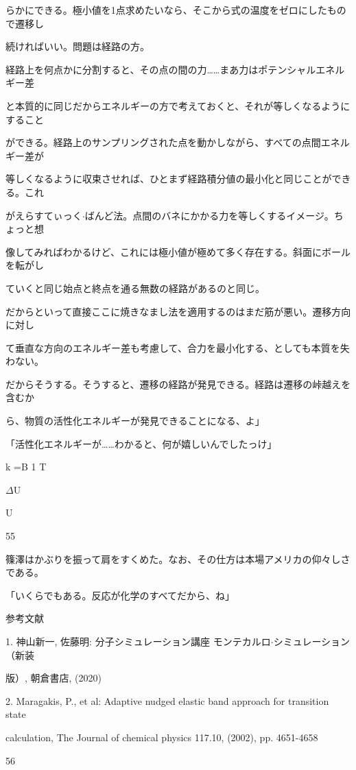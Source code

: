 らかにできる。極⼩値を1点求めたいなら、そこから式の温度をゼロにしたもので遷移し\par
続ければいい。問題は経路の⽅。\par
経路上を何点かに分割すると、その点の間の⼒……まあ⼒はポテンシャルエネルギー差\par
と本質的に同じだからエネルギーの⽅で考えておくと、それが等しくなるようにすること\par
ができる。経路上のサンプリングされた点を動かしながら、すべての点間エネルギー差が\par
等しくなるように収束させれば、ひとまず経路積分値の最⼩化と同じことができる。これ\par
がえらすてぃっく$\cdot$ばんど法。点間のバネにかかる⼒を等しくするイメージ。ちょっと想\par
像してみればわかるけど、これには極⼩値が極めて多く存在する。斜⾯にボールを転がし\par
ていくと同じ始点と終点を通る無数の経路があるのと同じ。\par
だからといって直接ここに焼きなまし法を適⽤するのはまだ筋が悪い。遷移⽅向に対し\par
て垂直な⽅向のエネルギー差も考慮して、合⼒を最⼩化する、としても本質を失わない。\par
だからそうする。そうすると、遷移の経路が発⾒できる。経路は遷移の峠越えを含むか\par
ら、物質の活性化エネルギーが発⾒できることになる、よ」\par
「活性化エネルギーが……わかると、何が嬉しいんでしたっけ」\par
k  =B 1 T\par
$\Delta$U\par
U\par
55\par

篠澤はかぶりを振って肩をすくめた。なお、その仕⽅は本場アメリカの仰々しさである。\par
「いくらでもある。反応が化学のすべてだから、ね」\par
参考⽂献\par
1. 神⼭新⼀, 佐藤明: 分⼦シミュレーション講座 モンテカルロ$\cdot$シミュレーション（新装\par
版）, 朝倉書店, (2020)\par
2. Maragakis, P., et al: Adaptive nudged elastic band approach for transition state\par
calculation, The Journal of chemical physics 117.10, (2002), pp. 4651-4658\par
56\par

